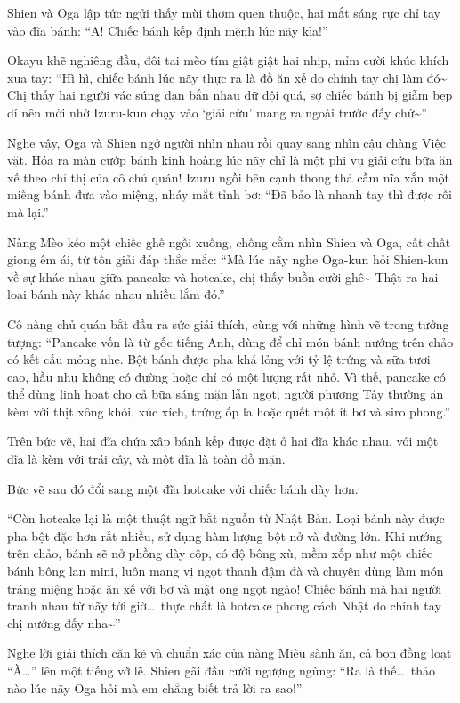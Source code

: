 \documentclass[../main.tex]{subfiles}
\begin{document}
Shien và Oga lập tức ngửi thấy mùi thơm quen thuộc, hai mắt sáng rực chỉ tay vào đĩa bánh: ``A! Chiếc bánh kếp định mệnh lúc nãy kìa!''

Okayu khẽ nghiêng đầu, đôi tai mèo tím giật giật hai nhịp, mỉm cười khúc khích xua tay: ``Hì hì, chiếc bánh lúc nãy thực ra là đồ ăn xế do chính tay chị làm đó\~{} Chị thấy hai người vác súng đạn bắn nhau dữ dội quá, sợ chiếc bánh bị giẫm bẹp dí nên mới nhờ Izuru-kun chạy vào `giải cứu' mang ra ngoài trước đấy chứ\~{}''

Nghe vậy, Oga và Shien ngớ người nhìn nhau rồi quay sang nhìn cậu chàng Việc vặt. Hóa ra màn cướp bánh kinh hoàng lúc nãy chỉ là một phi vụ giải cứu bữa ăn xế theo chỉ thị của cô chủ quán! Izuru ngồi bên cạnh thong thả cầm nĩa xắn một miếng bánh đưa vào miệng, nháy mắt tỉnh bơ: ``Đã bảo là nhanh tay thì được rồi mà lại.''

Nàng Mèo kéo một chiếc ghế ngồi xuống, chống cằm nhìn Shien và Oga, cất chất giọng êm ái, từ tốn giải đáp thắc mắc: ``Mà lúc nãy nghe Oga-kun hỏi Shien-kun về sự khác nhau giữa pancake và hotcake, chị thấy buồn cười ghê\~{} Thật ra hai loại bánh này khác nhau nhiều lắm đó.''

Cô nàng chủ quán bắt đầu ra sức giải thích, cùng với những hình vẽ trong tưởng tượng: ``Pancake vốn là từ gốc tiếng Anh, dùng để chỉ món bánh nướng trên chảo có kết cấu mỏng nhẹ. Bột bánh được pha khá lỏng với tỷ lệ trứng và sữa tươi cao, hầu như không có đường hoặc chỉ có một lượng rất nhỏ. Vì thế, pancake có thể dùng linh hoạt cho cả bữa sáng mặn lẫn ngọt, người phương Tây thường ăn kèm với thịt xông khói, xúc xích, trứng ốp la hoặc quết một ít bơ và siro phong.''

Trên bức vẽ, hai đĩa chứa xâp bánh kếp được đặt ở hai đĩa khác nhau, với một đĩa là kèm với trái cây, và một đĩa là toàn đồ mặn.

Bức vẽ sau đó đổi sang một đĩa hotcake với chiếc bánh dày hơn.

``Còn hotcake lại là một thuật ngữ bắt nguồn từ Nhật Bản. Loại bánh này được pha bột đặc hơn rất nhiều, sử dụng hàm lượng bột nở và đường lớn. Khi nướng trên chảo, bánh sẽ nở phồng dày cộp, có độ bông xù, mềm xốp như một chiếc bánh bông lan mini, luôn mang vị ngọt thanh đậm đà và chuyên dùng làm món tráng miệng hoặc ăn xế với bơ và mật ong ngọt ngào! Chiếc bánh mà hai người tranh nhau từ nãy tới giờ\dots\ thực chất là hotcake phong cách Nhật do chính tay chị nướng đấy nha\~{}''

Nghe lời giải thích cặn kẽ và chuẩn xác của nàng Miêu sành ăn, cả bọn đồng loạt ``À\dots'' lên một tiếng vỡ lẽ. Shien gãi đầu cười ngượng ngùng: ``Ra là thế\dots\ thảo nào lúc nãy Oga hỏi mà em chẳng biết trả lời ra sao!''
\end{document}
